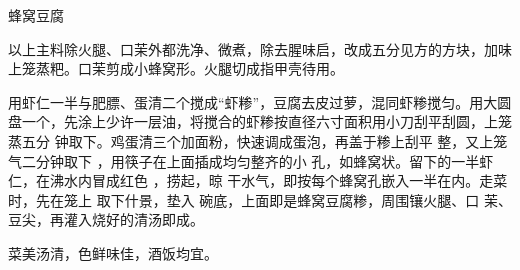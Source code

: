\begin{recipe}{蜂窝豆腐}

\ingredients


\preparation

\step 以上主料除火腿、口茉外都洗净、微煮，除去腥味启，改成五分见方的方块，加味
上笼蒸粑。口茉剪成小蜂窝形。火腿切成指甲壳待用。

\step 用虾仁一半与肥膘、蛋清二个搅成“虾糁”，豆腐去皮过萝，混同虾糁搅匀。用大圆
盘一个，先涂上少许一层油，将搅合的虾糁按直径六寸面积用小刀刮平刮圆，上笼蒸五分
钟取下。鸡蛋清三个加面粉，快速调成蛋泡，再盖于糁上刮平 整，又上笼气二分钟取下
，用筷子在上面插成均匀整齐的小 孔，如蜂窝状。留下的一半虾仁，在沸水内冒成红色
，捞起，晾 干水气，即按每个蜂窝孔嵌入一半在内。走菜时，先在笼上 取下什景，垫入
碗底，上面即是蜂窝豆腐糁，周围镶火腿、口 茉、豆尖，再灌入烧好的清汤即成。

\features

菜美汤清，色鲜味佳，酒饭均宜。

\end{recipe}

